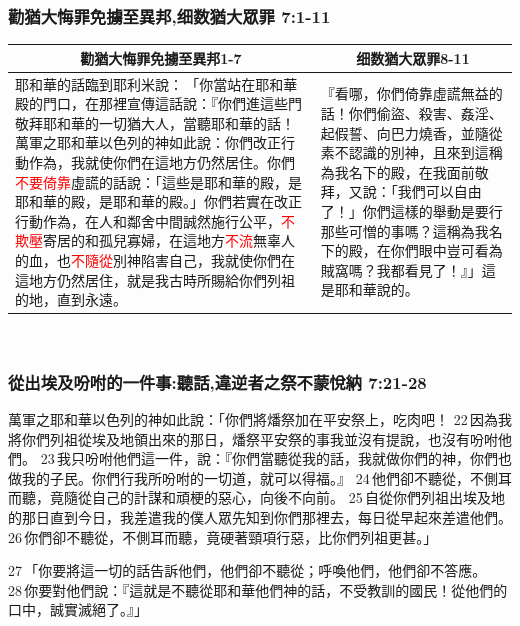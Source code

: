 \subsubsection{勸猶大悔罪免擄至異邦,细数猶大眾罪 7:1-11}
\begin{table}[H]
\centering
\begin{tabular}{p{10.75cm}|p{6.50cm}}\hline\hline
\multicolumn{1}{c|}{勸猶大悔罪免擄至異邦1-7}&\multicolumn{1}{c}{细数猶大眾罪8-11}\\\hline
耶和華的話臨到耶利米說： 「你當站在耶和華殿的門口，在那裡宣傳這話說：『你們進這些門敬拜耶和華的一切猶大人，當聽耶和華的話！萬軍之耶和華以色列的神如此說：你們改正行動作為，我就使你們在這地方仍然居住。你們\textcolor{red}{不要倚靠}虛謊的話說：「這些是耶和華的殿，是耶和華的殿，是耶和華的殿。」你們若實在改正行動作為，在人和鄰舍中間誠然施行公平，\textcolor{red}{不欺壓}寄居的和孤兒寡婦，在這地方\textcolor{red}{不流}無辜人的血，也\textcolor{red}{不隨從}別神陷害自己，我就使你們在這地方仍然居住，就是我古時所賜給你們列祖的地，直到永遠。
&『看哪，你們倚靠虛謊無益的話！你們偷盜、殺害、姦淫、起假誓、向巴力燒香，並隨從素不認識的別神，且來到這稱為我名下的殿，在我面前敬拜，又說：「我們可以自由了！」你們這樣的舉動是要行那些可憎的事嗎？這稱為我名下的殿，在你們眼中豈可看為賊窩嗎？我都看見了！』」這是耶和華說的。\\\hline
\end{tabular}
\end{table}

 



\subsubsection{從出埃及吩咐的一件事:聽話,違逆者之祭不蒙悅納 7:21-28}
萬軍之耶和華以色列的神如此說：「你們將燔祭加在平安祭上，吃肉吧！ 22 因為我將你們列祖從埃及地領出來的那日，燔祭平安祭的事我並沒有提說，也沒有吩咐他們。 23 我只吩咐他們這一件，說：『你們當聽從我的話，我就做你們的神，你們也做我的子民。你們行我所吩咐的一切道，就可以得福。』 24 他們卻不聽從，不側耳而聽，竟隨從自己的計謀和頑梗的惡心，向後不向前。 25 自從你們列祖出埃及地的那日直到今日，我差遣我的僕人眾先知到你們那裡去，每日從早起來差遣他們。 26 你們卻不聽從，不側耳而聽，竟硬著頸項行惡，比你們列祖更甚。」

27 「你要將這一切的話告訴他們，他們卻不聽從；呼喚他們，他們卻不答應。 28 你要對他們說：『這就是不聽從耶和華他們神的話，不受教訓的國民！從他們的口中，誠實滅絕了。』」

